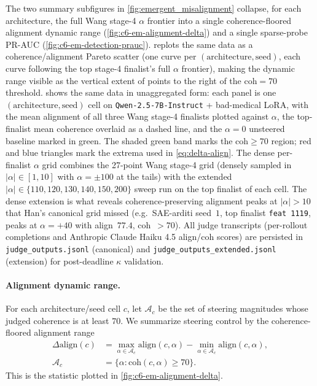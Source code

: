 The two summary subfigures in \cref{fig:emergent_misalignment} collapse, for each architecture, the full Wang stage-4 $\alpha$ frontier into a single coherence-floored alignment dynamic range (\cref{fig:c6-em-alignment-delta}) and a single sparse-probe PR-AUC (\cref{fig:c6-em-detection-prauc}).  replots the same data as a coherence/alignment Pareto scatter (one curve per $(\text{architecture}, \text{seed})$, each curve following the top stage-4 finalist's full $\alpha$ frontier), making the dynamic range visible as the vertical extent of points to the right of the $\text{coh} = 70$ threshold.  shows the same data in unaggregated form: each panel is one $(\text{architecture}, \text{seed})$ cell on \texttt{Qwen-2.5-7B-Instruct} + bad-medical LoRA, with the mean alignment of all three Wang stage-4 finalists plotted against $\alpha$, the top-finalist mean coherence overlaid as a dashed line, and the $\alpha\!=\!0$ unsteered baseline marked in green. The shaded green band marks the $\mathrm{coh}\geq70$ region; red and blue triangles mark the extrema used in \cref{eq:delta-align}. The dense per-finalist $\alpha$ grid combines the 27-point Wang stage-4 grid (densely sampled in $|\alpha| \in [1, 10]$ with $\alpha = \pm 100$ at the tails) with the extended $|\alpha| \in \{110, 120, 130, 140, 150, 200\}$ sweep run on the top finalist of each cell. The dense extension is what reveals coherence-preserving alignment peaks at $|\alpha| > 10$ that Han's canonical grid missed (e.g.\ SAE-arditi seed~$1$, top finalist \texttt{feat 1119}, peaks at $\alpha = +40$ with align~$77.4$, coh~$> 70$). All judge transcripts (per-rollout completions and Anthropic Claude Haiku 4.5 align/coh scores) are persisted in \texttt{judge\_outputs.jsonl} (canonical) and \texttt{judge\_outputs\_extended.jsonl} (extension) for post-deadline $\kappa$ validation.

\paragraph{Alignment dynamic range.}
For each architecture/seed cell $c$, let $\mathcal A_c$ be the set of steering
magnitudes whose judged coherence is at least $70$. We summarize steering
control by the coherence-floored alignment range
\begin{equation}
    \begin{aligned}
    \Delta\mathrm{align}(c)
    & = \max_{\alpha\in\mathcal A_c}\mathrm{align}(c,\alpha)
    - \min_{\alpha\in\mathcal A_c}\mathrm{align}(c,\alpha), \\
    \mathcal A_c
    & = \{\alpha:\mathrm{coh}(c,\alpha)\ge 70\}.
    \end{aligned}
    \label{eq:delta-align}
\end{equation}
This is the statistic plotted in \cref{fig:c6-em-alignment-delta}.

